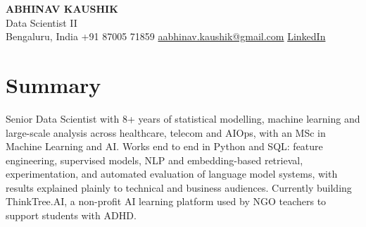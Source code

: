 \documentclass[10pt,a4paper]{article}
\begin{document}
\begin{center}
  {\LARGE\bfseries ABHINAV KAUSHIK}\\[2pt]
  {\large Data Scientist II}\\[2pt]
  Bengaluru, India \textbar{} +91 87005 71859 \textbar{} \href{mailto:aabhinav.kaushik@gmail.com}{aabhinav.kaushik@gmail.com} \textbar{} \href{https://www.linkedin.com/in/abhinav-kaushik10/}{LinkedIn}  
\end{center}

\section{Summary}
Senior Data Scientist with 8+ years of statistical modelling, machine learning and large-scale analysis across healthcare, telecom and AIOps, with an MSc in Machine Learning and AI. Works end to end in Python and SQL: feature engineering, supervised models, NLP and embedding-based retrieval, experimentation, and automated evaluation of language model systems, with results explained plainly to technical and business audiences. Currently building ThinkTree.AI, a non-profit AI learning platform used by NGO teachers to support students with ADHD.
\end{document}
